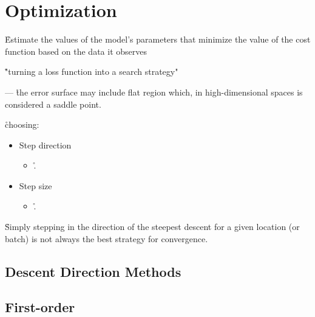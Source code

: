 \section{Optimization}
\label{subsec:optimization}


\r{Estimate the values of the model's parameters that minimize the value of the cost function based on the data it observes}

\r{"turning a loss function into a search strategy"}


 --- \r{the error surface may include flat region which, in high-dimensional spaces is considered a saddle point.}


\r{choosing:}

\begin{itemize}[noitemsep,topsep=0pt]
	\item Step direction
	\begin{itemize}[noitemsep,topsep=0pt]
		\item \r{.}
	\end{itemize}
	\item Step size
	\begin{itemize}[noitemsep,topsep=0pt]
		\item \r{.}
	\end{itemize}
\end{itemize}

\r{Simply stepping in the direction of the steepest descent for a given location (or batch) is not always the best strategy for convergence. }



\subsection{Descent Direction Methods}




\subsection{First-order}

